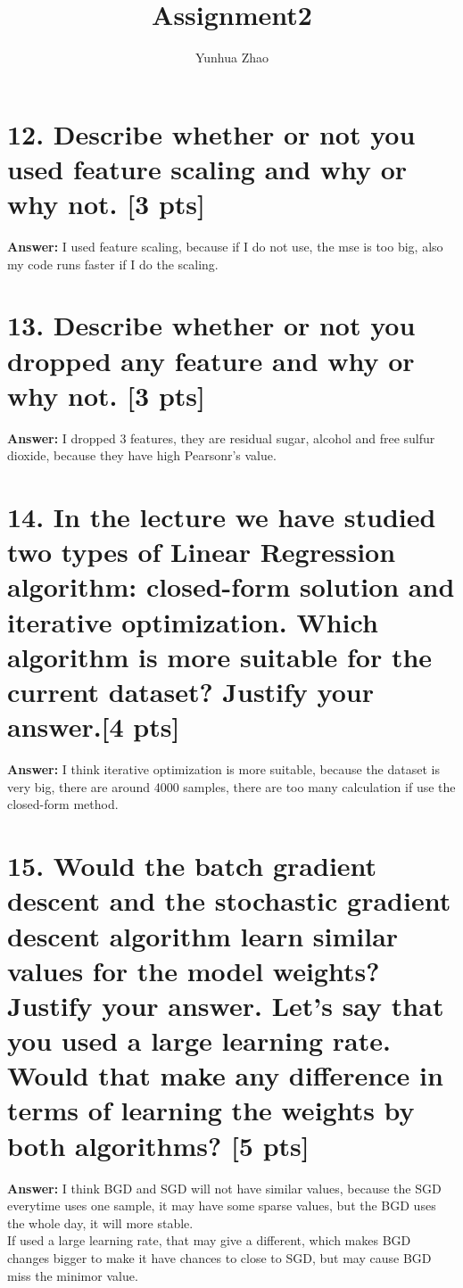 \documentclass{article}
\title{Assignment2}
\author{Yunhua Zhao}
\begin{document}
\maketitle
\section*{12. Describe whether or not you used feature scaling and why or why not. [3 pts]}
\textbf{Answer: } I used feature scaling, because if I do not use, the mse is too big, also my code runs faster if I do the scaling.



\section*{13. Describe whether or not you dropped any feature and why or why not. [3 pts]}
\textbf{Answer: } I dropped 3 features, they are residual sugar, alcohol and free sulfur dioxide, because they have high Pearsonr's value.



\section*{14. In the lecture we have studied two types of Linear Regression algorithm: closed-form solution and iterative optimization. Which algorithm is more suitable for the current dataset? Justify your answer.[4 pts]}
\textbf{Answer: } I think iterative optimization is more suitable, because the dataset is very big, there are around 4000 samples, there are too many calculation if use the closed-form method.


\section*{15. Would the batch gradient descent and the stochastic gradient descent algorithm learn similar 	values for the model weights? Justify your answer. Let’s say that you used a large learning rate. Would that make any difference in terms of learning the weights by both algorithms? [5	pts]}
\textbf{Answer: } I think BGD and SGD will not have similar values, because the SGD everytime uses one sample, it may have some sparse values, but the BGD uses the whole day, it will more stable. \\
If used a large learning rate, that may give a different, which makes BGD changes bigger to make it have chances to close to SGD, but may cause BGD miss the minimor value.
\end{document}
